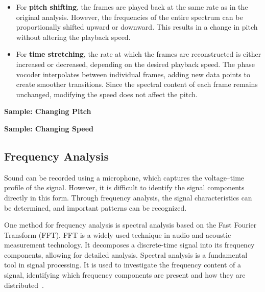 \begin{itemize}
	\item For \textbf{pitch shifting}, the frames are played back at the same rate as in the original analysis.  
	However, the frequencies of the entire spectrum can be proportionally shifted upward or downward.  
	This results in a change in pitch without altering the playback speed.
	
	\item For \textbf{time stretching}, the rate at which the frames are reconstructed is either increased or decreased, depending on the desired playback speed.  
	The phase vocoder interpolates between individual frames, adding new data points to create smoother transitions.  
	Since the spectral content of each frame remains unchanged, modifying the speed does not affect the pitch.
\end{itemize}


\bigskip

\textbf{Sample: Changing Pitch}

\begin{code}[!htp]
	\caption{Code for applying pitch shift to a stereo WAV file and saving the result} 
	\label{Code:Python:File:pitchShiftWavWrite}
\end{code}    


\textbf{Sample: Changing Speed}

\begin{code}[!htp]
	\caption{Speed up a WAV audio file and save the modified version} 
	\label{Code:Python:File:SpeedChangeAudio}
\end{code}    

\subsection{Frequency Analysis} \label{Frequenzanalyse}

Sound can be recorded using a microphone, which captures the voltage–time profile of the signal.  
However, it is difficult to identify the signal components directly in this form.  
Through frequency analysis, the signal characteristics can be determined, and important patterns can be recognized.

One method for frequency analysis is spectral analysis based on the Fast Fourier Transform (FFT).  
FFT is a widely used technique in audio and acoustic measurement technology.  
It decomposes a discrete-time signal into its frequency components, allowing for detailed analysis.  
Spectral analysis is a fundamental tool in signal processing.  
It is used to investigate the frequency content of a signal, identifying which frequency components are present and how they are distributed~.

